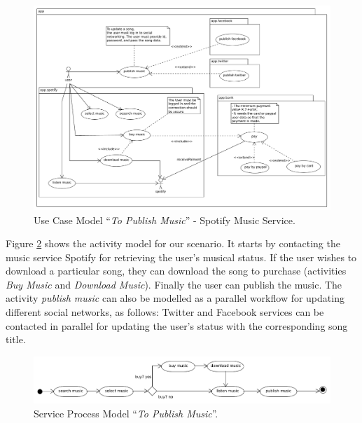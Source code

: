 \begin{figure}[ht!]
\centering
\includegraphics[width=.95\textwidth]{chapters/methodology/figs/runningExampleUCSingle.pdf}
\caption{Use Case Model ``\textit{To Publish Music}'' - Spotify Music Service.}
\label{fig:example_usecase}
\end{figure}





Figure \ref{fig:example_serviceprocess} shows the activity model for our
scenario. It starts by contacting the music service Spotify for retrieving the
user's musical status.  If the user wishes to download a particular song, they
can download the song to purchase (activities \textit{Buy Music} and
\textit{Download Music}). Finally the user can publish the music. The activity
\textit{publish music} can also be modelled as a parallel workflow for updating
different social networks, as follows: Twitter and Facebook services can be
contacted in parallel for updating the user's status with the corresponding song title.

\begin{figure}
\centering
\includegraphics[width=.95\textwidth]{chapters/methodology/figs/runningExampleSPSingle.pdf}
\caption{Service Process Model ``\textit{To Publish Music}''.}
\label{fig:example_serviceprocess}
\end{figure}

